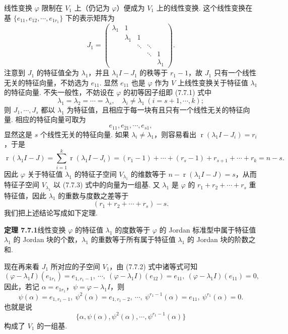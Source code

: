 \documentclass[UTF8,12pt,a4paper,fontset=fandol]{ctexart}
\begin{document}
线性变换 $\varphi$ 限制在 $V_1$ 上（仍记为 $\varphi$）便成为 $V_1$ 上的线性变换. 这个线性变换在基 $\{e_{11},e_{12},\cdots,e_{1r_1}\}$ 下的表示矩阵为
\[
J_1=\left(\begin{array}{ccccc}
\lambda_1 & 1 & & & \\
& \lambda_1 & 1 & & \\
& & \ddots & \ddots & \\
& & & \ddots & 1\\
& & & & \lambda_1
\end{array}\right).
\]
注意到 $J_1$ 的特征值全为 $\lambda_1$，并且 $\lambda_1I-J_1$ 的秩等于 $r_1-1$，故 $J_1$ 只有一个线性无关的特征向量，不妨选为 $e_{11}$. 显然 $e_{11}$ 也是 $\varphi$ 作为 $V$ 上线性变换关于特征值 $\lambda_1$ 的特征向量. 不失一般性，不妨设在 $\varphi$ 的初等因子组即 (7.7.1) 式中
\[
\lambda_1=\lambda_2=\cdots=\lambda_s,\quad \lambda_i\ne\lambda_1\ (i=s+1,\cdots,k);
\]
则 $J_1,\cdots,J_s$ 都以 $\lambda_1$ 为特征值，且相应于每一块有且只有一个线性无关的特征向量. 相应的特征向量可取为
\begin{equation}
e_{11},e_{21},\cdots,e_{s1},
\tag{7.7.3}
\end{equation}
显然这是 $s$ 个线性无关的特征向量. 如果 $\lambda_i\ne\lambda_1$，则容易看出 $\operatorname{r}(\lambda_1I-J_i)=r_i$，于是
\[
\operatorname{r}(\lambda_1I-J)=\sum_{i=1}^k\operatorname{r}(\lambda_1I-J_i)=(r_1-1)+\cdots+(r_s-1)+r_{s+1}+\cdots+r_k=n-s.
\]
因此 $\varphi$ 关于特征值 $\lambda_1$ 的特征子空间 $V_{\lambda_1}$ 的维数等于 $n-\operatorname{r}(\lambda_1I-J)=s$，从而特征子空间 $V_{\lambda_1}$ 以 (7.7.3) 式中的向量为一组基. 又 $\lambda_1$ 是 $\varphi$ 的 $r_1+r_2+\cdots+r_s$ 重特征值，因此 $\lambda_1$ 的重数与度数之差等于
\[
(r_1+r_2+\cdots+r_s)-s.
\]
我们把上述结论写成如下定理.

\noindent\textbf{定理 7.7.1}\quad 线性变换 $\varphi$ 的特征值 $\lambda_1$ 的度数等于 $\varphi$ 的 Jordan 标准型中属于特征值 $\lambda_1$ 的 Jordan 块的个数，$\lambda_1$ 的重数等于所有属于特征值 $\lambda_1$ 的 Jordan 块的阶数之和.

现在再来看 $J_1$ 所对应的子空间 $V_1$，由 (7.7.2) 式中诸等式可知
\[
(\varphi-\lambda_1I)(e_{1r_1})=e_{1,r_1-1},\ \cdots,\ (\varphi-\lambda_1I)(e_{12})=e_{11},\ (\varphi-\lambda_1I)(e_{11})=0,
\]
因此，若记 $\alpha=e_{1r_1}$，$\psi=\varphi-\lambda_1I$，则
\[
\psi(\alpha)=e_{1,r_1-1},\ \psi^2(\alpha)=e_{1,r_1-2},\ \cdots,\ \psi^{r_1-1}(\alpha)=e_{11},\ \psi^{r_1}(\alpha)=0.
\]
也就是说
\[
\{\alpha,\psi(\alpha),\psi^2(\alpha),\cdots,\psi^{r_1-1}(\alpha)\}
\]
构成了 $V_1$ 的一组基.
\end{document}
